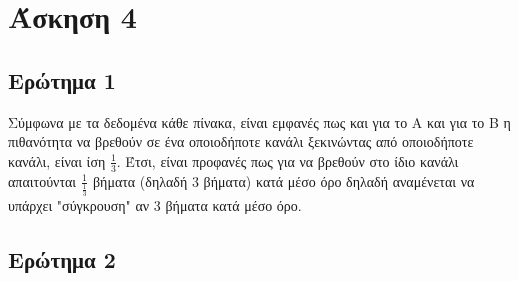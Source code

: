 \section*{Άσκηση 4}
\label{ex4}

\subsection*{Ερώτημα 1}
\label{ex4q1}

Σύμφωνα με τα δεδομένα κάθε πίνακα, είναι εμφανές πως και για το Α και για το Β η πιθανότητα να βρεθούν σε ένα οποιοδήποτε κανάλι ξεκινώντας από οποιοδήποτε κανάλι, είναι ίση $\frac{1}{3}$. Έτσι, είναι προφανές πως για να βρεθούν στο ίδιο κανάλι απαιτούνται $\frac{1}{\frac{1}{3}}$ βήματα (δηλαδή 3 βήματα) κατά μέσο όρο δηλαδή αναμένεται να υπάρχει "σύγκρουση" αν 3 βήματα κατά μέσο όρο.
\subsection*{Ερώτημα 2}
\label{ex4q2}
